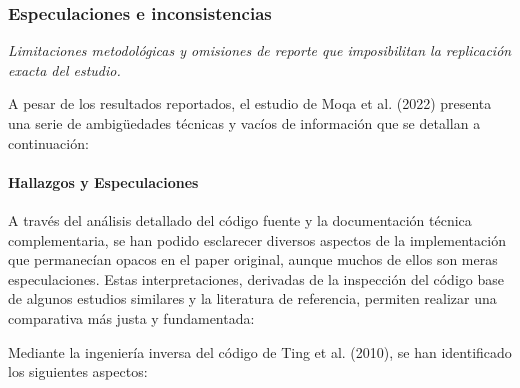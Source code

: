 \documentclass[a4paper,10pt]{article}
\begin{document}
\subsubsection{Especulaciones e inconsistencias}
\textit{Limitaciones metodológicas y omisiones de reporte que imposibilitan la replicación exacta del estudio.}

A pesar de los resultados reportados, el estudio de Moqa et al. (2022) presenta una serie de ambigüedades técnicas y vacíos de información que se detallan a continuación:

\paragraph{Hallazgos y Especulaciones}
A través del análisis detallado del código fuente y la documentación técnica complementaria, se han podido esclarecer diversos aspectos de la implementación que permanecían opacos en el paper original, aunque muchos de ellos son meras especulaciones. Estas interpretaciones, derivadas de la inspección del código base de algunos estudios similares y la literatura de referencia, permiten realizar una comparativa más justa y fundamentada:

Mediante la ingeniería inversa del código de Ting et al. (2010), se han identificado los siguientes aspectos:
\end{document}
